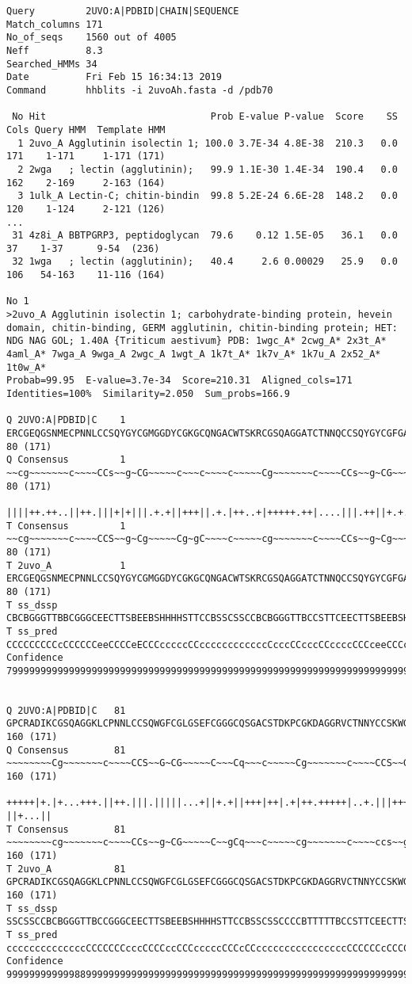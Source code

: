 \begin{verbatim}
Query         2UVO:A|PDBID|CHAIN|SEQUENCE
Match_columns 171
No_of_seqs    1560 out of 4005
Neff          8.3
Searched_HMMs 34
Date          Fri Feb 15 16:34:13 2019
Command       hhblits -i 2uvoAh.fasta -d /pdb70

 No Hit                             Prob E-value P-value  Score    SS Cols Query HMM  Template HMM
  1 2uvo_A Agglutinin isolectin 1; 100.0 3.7E-34 4.8E-38  210.3   0.0  171    1-171     1-171 (171)
  2 2wga   ; lectin (agglutinin);   99.9 1.1E-30 1.4E-34  190.4   0.0  162    2-169     2-163 (164)
  3 1ulk_A Lectin-C; chitin-bindin  99.8 5.2E-24 6.6E-28  148.2   0.0  120    1-124     2-121 (126)
...
 31 4z8i_A BBTPGRP3, peptidoglycan  79.6    0.12 1.5E-05   36.1   0.0   37    1-37      9-54  (236)
 32 1wga   ; lectin (agglutinin);   40.4     2.6 0.00029   25.9   0.0  106   54-163    11-116 (164)

No 1
>2uvo_A Agglutinin isolectin 1; carbohydrate-binding protein, hevein domain, chitin-binding, GERM agglutinin, chitin-binding protein; HET: NDG NAG GOL; 1.40A {Triticum aestivum} PDB: 1wgc_A* 2cwg_A* 2x3t_A* 4aml_A* 7wga_A 9wga_A 2wgc_A 1wgt_A 1k7t_A* 1k7v_A* 1k7u_A 2x52_A* 1t0w_A*
Probab=99.95  E-value=3.7e-34  Score=210.31  Aligned_cols=171  Identities=100%  Similarity=2.050  Sum_probs=166.9

Q 2UVO:A|PDBID|C    1 ERCGEQGSNMECPNNLCCSQYGYCGMGGDYCGKGCQNGACWTSKRCGSQAGGATCTNNQCCSQYGYCGFGAEYCGAGCQG   80 (171)
Q Consensus         1 ~~cg~~~~~~~c~~~~CCs~~g~CG~~~~~c~~~c~~~~c~~~~~Cg~~~~~~~c~~~~CCs~~g~CG~~~~~c~~~c~~   80 (171)
                      ||||++.++..||++.|||+|+|||.+.+||+++||.+.|++..+|+++++.++|....|||.++||+.+.+||+.+||.
T Consensus         1 ~~cg~~~~~~~c~~~~CCS~~g~Cg~~~~~Cg~gC~~~~c~~~~~cg~~~~~~~c~~~~CCs~~g~Cg~~~~~c~~~c~~   80 (171)
T 2uvo_A            1 ERCGEQGSNMECPNNLCCSQYGYCGMGGDYCGKGCQNGACWTSKRCGSQAGGATCTNNQCCSQYGYCGFGAEYCGAGCQG   80 (171)
T ss_dssp             CBCBGGGTTBBCGGGCEECTTSBEEBSHHHHSTTCCBSSCSSCCBCBGGGTTBCCSTTCEECTTSBEEBSHHHHSTTCCB
T ss_pred             CCCCCCCCCcCCCCCCeeCCCCeECCCcccccCCccccccccccccCcccCCcccCCccccCCCceeCCCccccCCCccc
Confidence            79999999999999999999999999999999999999999999999999999999999999999999999999999999


Q 2UVO:A|PDBID|C   81 GPCRADIKCGSQAGGKLCPNNLCCSQWGFCGLGSEFCGGGCQSGACSTDKPCGKDAGGRVCTNNYCCSKWGSCGIGPGYC  160 (171)
Q Consensus        81 ~~~~~~~~Cg~~~~~~~c~~~~CCS~~G~CG~~~~~C~~~Cq~~~c~~~~~Cg~~~~~~~c~~~~CCS~~G~CG~~~~~C  160 (171)
                      +++++|+.|+...+++.||++.|||.|||||...+||+.+||+++|++|.+|++.+++++|..+.|||+++-||+...||
T Consensus        81 ~~~~~~~~cg~~~~~~~c~~~~CCs~~g~CG~~~~~C~~gCq~~~c~~~~~cg~~~~~~~c~~~~ccs~~g~Cg~~~~~C  160 (171)
T 2uvo_A           81 GPCRADIKCGSQAGGKLCPNNLCCSQWGFCGLGSEFCGGGCQSGACSTDKPCGKDAGGRVCTNNYCCSKWGSCGIGPGYC  160 (171)
T ss_dssp             SSCSSCCBCBGGGTTBCCGGGCEECTTSBEEBSHHHHSTTCCBSSCSSCCCCBTTTTTBCCSTTCEECTTSCEEBSHHHH
T ss_pred             ccccccccccccccCCCCCCCcccCCCCccCCCcccccCCCcCCccccccccccccccccCCCCCCcCCCCEecCchhhc
Confidence            99999999999988999999999999999999999999999999999999999999999999999999999999999999



\end{verbatim}

